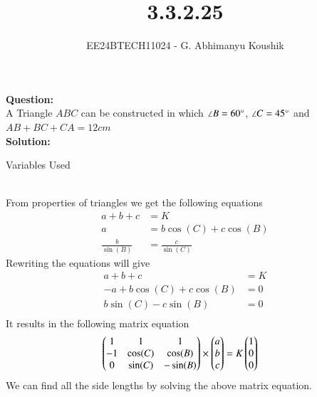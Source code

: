 \documentclass[journal]{IEEEtran}
\begin{document}

\vspace{3cm}

\title{3.3.2.25}
\author{EE24BTECH11024 - G. Abhimanyu Koushik
}
{\let\newpage\relax\maketitle}

\renewcommand{\thefigure}{\theenumi}
\renewcommand{\thetable}{\theenumi}
\setlength{\intextsep}{10pt} %

\textbf{Question:}\\
A Triangle $ABC$ can be constructed in which $\angle B=60\degree$, $\angle C=45\degree$ and $AB+BC+CA=12cm$\\
\textbf{Solution:}
\begin{table}[h!]    
  \centering
  
  \caption{Variables Used}
  \label{tab10.5.3.9.1}
\end{table}\\
From properties of triangles we get the following equations
\begin{align}
a+b+c&=K\\
a&=b\cos(C)+c\cos(B)\\
\frac{b}{\sin(B)}&=\frac{c}{\sin(C)}
\end{align}
Rewriting the equations will give
\begin{align}
	a+b+c&=K\\
	-a+b\cos(C)+c\cos(B)&=0\\
	b\sin(C)-c\sin(B)&=0\\
\end{align}
It results in the following matrix equation
\begin{align}
  \begin{pmatrix}1 & 1 & 1\\-1 & \cos(C) & \cos(B)\\0 & \sin(C) & -\sin(B)\end{pmatrix}\times\begin{pmatrix}a\\b\\c\end{pmatrix}&=K\begin{pmatrix}1\\0\\0\end{pmatrix}
\end{align}
We can find all the side lengths by solving the above matrix equation.
\end{document}
